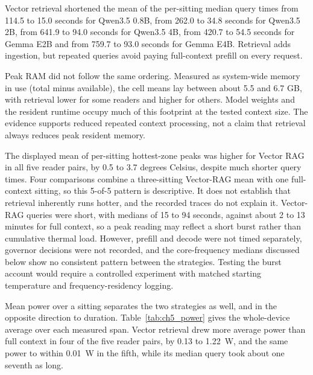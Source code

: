Vector retrieval shortened the mean of the per-sitting median query times from 114.5 to
15.0 seconds for Qwen3.5 0.8B, from 262.0 to 34.8 seconds for Qwen3.5 2B, from 641.9 to
94.0 seconds for Qwen3.5 4B, from 420.7 to 54.5 seconds for Gemma E2B and from 759.7 to
93.0 seconds for Gemma E4B. Retrieval adds ingestion, but repeated queries avoid paying
full-context prefill on every request.

Peak RAM did not follow the same ordering. Measured as system-wide memory in use (total minus
available), the cell means lay between about 5.5 and 6.7 GB, with
retrieval lower for some readers and higher for others. Model weights and the resident
runtime occupy much of this footprint at the tested context size. The evidence supports
reduced repeated context processing, not a claim that retrieval always reduces peak
resident memory.

The displayed mean of per-sitting hottest-zone peaks was higher for Vector RAG in all five reader
pairs, by 0.5 to 3.7 degrees Celsius, despite much shorter query times. Four comparisons
combine a three-sitting Vector-RAG mean with one full-context sitting, so this 5-of-5
pattern is descriptive. It does not establish that retrieval inherently runs hotter, and the recorded traces do not
explain it. Vector-RAG queries were short, with medians of 15 to 94 seconds, against about 2 to
13 minutes for full context, so a peak reading may reflect a short burst rather than cumulative
thermal load. However, prefill and decode were not timed separately, governor decisions were not
recorded, and the core-frequency medians discussed below show no consistent pattern between the
strategies. Testing the burst account would require a controlled experiment with matched starting
temperature and frequency-residency logging.

Mean power over a sitting separates the two strategies as well, and in the opposite direction to
duration. Table~\ref{tab:ch5_power} gives the whole-device average over each measured span. Vector
retrieval drew more average power than full context in four of the five reader pairs, by 0.13 to
1.22~W, and the same power to within 0.01~W in the fifth, while its median query took about one
seventh as long.

